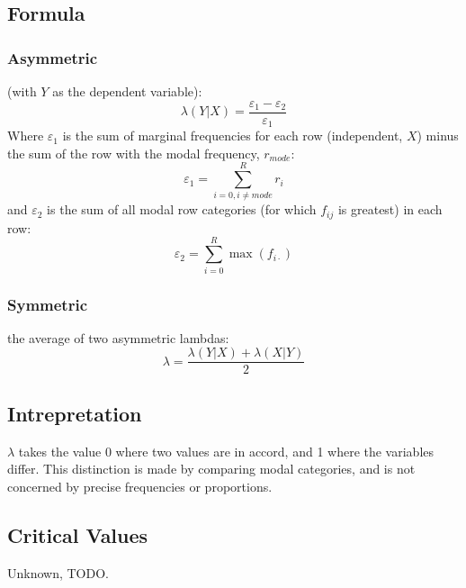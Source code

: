 \documentclass[11pt]{article}
\begin{document}
\subsection{Formula}
\subsubsection{Asymmetric}
(with $Y$ as the dependent variable):
$$
\lambda(Y|X) = \frac{ \varepsilon_1 - \varepsilon_2 }{ \varepsilon_1 }
$$
Where $\varepsilon_1$ is the sum of marginal frequencies for each row (independent, $X$) minus the sum of the row with the modal frequency, $r_{mode}$:
$$
\varepsilon_1 = \sum_{i=0, i \neq mode}^{R}{ r_i }
$$
and $\varepsilon_2$ is the sum of all modal row categories (for which $f_{ij}$ is greatest) in each row:
$$
\varepsilon_2 = \sum_{i=0}^{R}{ \max( f_{i\cdot} ) }
$$

\subsubsection{Symmetric}
the average of two asymmetric lambdas:
$$
\lambda = \frac{ \lambda(Y|X) + \lambda(X|Y) }{ 2 }
$$



\subsection{Intrepretation}
$\lambda$ takes the value 0 where two values are in accord, and 1 where the variables differ.  This distinction is made by comparing modal categories, and is not concerned by precise frequencies or proportions.

\subsection{Critical Values}
Unknown, TODO.
\end{document}
